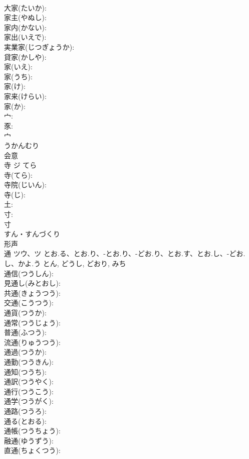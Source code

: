 \documentclass[8pt]{extreport}
\begin{document}
\begin{CJK}{UTF8}{min}
\\	大家(たいか): 
\\	家主(やぬし): 
\\	家内(かない): 
\\	家出(いえで): 
\\	実業家(じつぎょうか): 
\\	貸家(かしや): 
\\	家(いえ): 
\\	家(うち): 
\\	家(け): 
\\	家来(けらい): 
\\	家(か): 
\\	宀: 
\\	豕: 
\\	宀	
\\	うかんむり	
\\	会意 
\\	寺	ジ	てら		
\\	寺(てら): 
\\	寺院(じいん): 
\\	寺(じ): 
\\	土: 
\\	寸: 
\\	寸	
\\	すん・すんづくり	
\\	形声 
\\	通	ツウ、ツ	とお.る、とお.り、-とお.り、-どお.り、とお.す、とお.し、-どお.し、かよ.う	とん, どうし, どおり, みち	
\\	通信(つうしん): 
\\	見通し(みとおし): 
\\	共通(きょうつう): 
\\	交通(こうつう): 
\\	通貨(つうか): 
\\	通常(つうじょう): 
\\	普通(ふつう): 
\\	流通(りゅうつう): 
\\	通過(つうか): 
\\	通勤(つうきん): 
\\	通知(つうち): 
\\	通訳(つうやく): 
\\	通行(つうこう): 
\\	通学(つうがく): 
\\	通路(つうろ): 
\\	通る(とおる): 
\\	通帳(つうちょう): 
\\	融通(ゆうずう): 
\\	直通(ちょくつう): 

\end{CJK}
\end{document}
